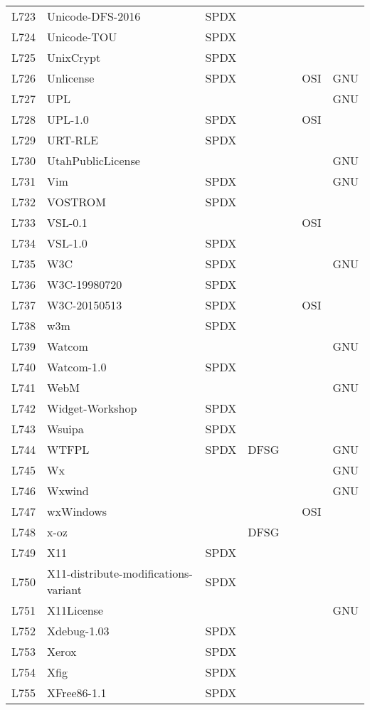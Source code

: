 \begin{longtable}[h]{m{2cm} | m{7cm} | c | c | c | c | c}
  L723 & Unicode-DFS-2016 & SPDX &  &  &  &  \\
  L724 & Unicode-TOU & SPDX &  &  &  &  \\
  L725 & UnixCrypt & SPDX &  &  &  &  \\
  L726 & Unlicense & SPDX &  &  & OSI & GNU \\
  L727 & UPL &  &  &  &  & GNU \\
  L728 & UPL-1.0 & SPDX &  &  & OSI &  \\
  L729 & URT-RLE & SPDX &  &  &  &  \\
  L730 & UtahPublicLicense &  &  &  &  & GNU \\
  L731 & Vim & SPDX &  &  &  & GNU \\
  L732 & VOSTROM & SPDX &  &  &  &  \\
  L733 & VSL-0.1 &  &  &  & OSI &  \\
  L734 & VSL-1.0 & SPDX &  &  &  &  \\
  L735 & W3C & SPDX &  &  &  & GNU \\
  L736 & W3C-19980720 & SPDX &  &  &  &  \\
  L737 & W3C-20150513 & SPDX &  &  & OSI &  \\
  L738 & w3m & SPDX &  &  &  &  \\
  L739 & Watcom &  &  &  &  & GNU \\
  L740 & Watcom-1.0 & SPDX &  &  &  &  \\
  L741 & WebM &  &  &  &  & GNU \\
  L742 & Widget-Workshop & SPDX &  &  &  &  \\
  L743 & Wsuipa & SPDX &  &  &  &  \\
  L744 & WTFPL & SPDX & DFSG &  &  & GNU \\
  L745 & Wx &  &  &  &  & GNU \\
  L746 & Wxwind &  &  &  &  & GNU \\
  L747 & wxWindows &  &  &  & OSI &  \\
  L748 & x-oz &  & DFSG &  &  &  \\
  L749 & X11 & SPDX &  &  &  &  \\
  L750 & X11-distribute-modifications-variant & SPDX &  &  &  &  \\
  L751 & X11License &  &  &  &  & GNU \\
  L752 & Xdebug-1.03 & SPDX &  &  &  &  \\
  L753 & Xerox & SPDX &  &  &  &  \\
  L754 & Xfig & SPDX &  &  &  &  \\
  L755 & XFree86-1.1 & SPDX &  &  &  &  \\

\end{longtable}
